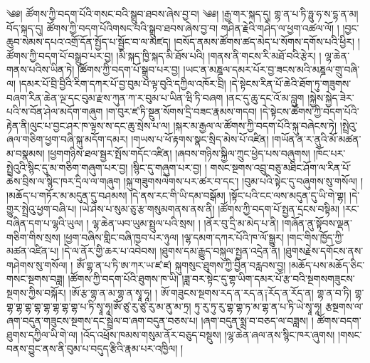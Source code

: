 ༄༅། ཚོགས་ཀྱི་བདག་པོའི་གསང་བའི་སྒྲུབ་ཐབས་ཞེས་བྱ་བ། ༄༅། །རྒྱ་གར་སྐད་དུ། གྷ་ན་པ་ཏི་ཧྥུ་ཧ་ས་དྷ་ན་མ། བོད་སྐད་དུ། ཚོགས་ཀྱི་བདག་པོའིགསང་བའི་སྒྲུབ་ཐབས་ཞེས་བྱ་བ། གཤིན་རྗེའི་གཤེད་ལ་ཕྱག་འཚལ་ལོ། ། །བྱང་ཆུབ་སེམས་དཔའ་འགྲོ་དོན་སྤྱོད་པ་སྦྱོང་བ་ལ་མཛད། །བསོད་ནམས་ཚོགས་ཚད་མེད་པ་སོགས་དགོས་པའི་ཕྱིར། ། ཚོགས་ཀྱི་བདག་པོ་བསྒྲུབ་པར་བྱ། །མི་སྐད་ཁྱི་སྐད་མི་ཐོས་པའི། །གནས་ནི་གངས་རི་མཐོ་བའི་རྩེར། ། ལྷ་ཆེན་གནས་པའིས་ཡིན་ཏེ། །ཚོགས་ཀྱི་བདག་པོ་སྒྲུབ་པར་བྱ། །ཡང་ན་མཎྜལ་དམར་པོར་བྱ་ཟངས་མའི་མཎྜལ་གྲུ་བཞི་ལ། །དམར་པོ་བྲི་བྱིའི་རིག་དཀར་པོ་བྱ་བུམ་པ་ལྟ་བུའི་དཀྱིལ་འཁོར་བྲི། །དེ་སྟེངས་རིན་པོ་ཆེའི་ཐོག་ཏུ་གཟུགས་བཞག་རིན་ཆེན་ལྔ་དང་བུམ་རྫས་ཀུན་ཀ་ར་བུམ་པ་ཡིན་ཝི་ཏི་བཞག །ནང་དུ་ཆུ་དང་འོ་མ་བླུག །སྐྱེས་སྐྱེད་ཟེར་པའི་ས་བོན་ཤེལ་མདོག་གཞུག །ག་བུར་ཛ་ཏི་སྔུན་སོགས་དྲི་བཟང་རྣམས་གདབ། །དེ་སྟེངས་ཚོགས་ཀྱི་བདག་པོའི་རྟེན་ནི།ལུང་པ་བྱང་ཤར་ཁ་ལྟས་ས་དང་ཆུ་སྲེས་པ་ལ། །སྐར་མ་རྒྱལ་ལ་ཚོགས་ཀྱི་བདག་པོའི་སྐུ་བཞེངས་ཏེ། །སྤྲེའུ་ཞལ་གཅིག་ཕྱག་བཞི་སྐུ་མདོག་དམར། །གཡས་པ་ཕོ་རྟགས་སྣང་སྲིད་མེས་པོ་འཛིན། །གཡོན་ན་ར་ནུའི་མོ་མཚན་མ་བསྣམས། །ཕྱགགཉིས་ཐལ་སྦྱར་སྤོས་གདོང་འཛིན། །ཞབས་གཉིས་སྐྱིལ་ཀྲུང་ཕྱེད་པས་བཞུགས། །ཁོང་པར་སྤྲེའུའི་སྙིང་དུ་མ་གཅིག་གཞུག་པར་བྱ། །སྙིང་དུ་གཞུག་པར་བྱ། ། གསང་སྔགས་འབྲུ་བཅུ་མཐིང་ཤོག་ལ་རིན་པོ་ཆེས་བྲིས་ལ་སྙིང་ཁར་དྲིལ་ལ་གཞུག །སྐུ་གཟུགསལེགས་པར་ཚར་བ་དང་། །བུམ་པའི་སྟེང་དུ་བཞུགས་སུ་གསོལ། ། །མཆོད་པ་གཏོར་མ་མདུན་དུ་བཤམས། །དེ་ནས་རང་གི་ཡི་དམ་བསྒོམ། །སྟོང་པའི་ངང་ལས་མདུན་དུ་ཡི་གེ་གྷ། །དེ་གྱུར་སྤྲེའུ་ཕྱག་བཞི་པ། །ཡེ་ཤེས་པ་སུམ་ཅུ་རྩ་གསུམགནས་ནས་ནི། །ཚོགས་ཀྱི་བདག་པོ་སྤྱན་དྲངས་བསྟིམ། །རང་བཞིན་དག་པ་ལྷའི་ཡུལ། ། ལྷ་ཆེན་ཡབ་ཡུམ་སྤྲུལ་པའི་སྲས། ། །ནོར་བུ་དྲི་མ་མེད་པ་ནི། །གཞོན་ནུ་སྟོབས་ལྡན་གཅིག་གིས་སྲས། །ཕྱག་བཞིས་གླིང་བཞི་ཁྱབ་པར་ཉུལ། །ལྷ་དམག་དཀར་པོའི་ཁ་ལོ་སྒྱུར། །གང་གིས་ཁྱོད་ཀྱི་མཚན་འཛིན་པ། །དེ་ལ་ནོར་གྱི་ཆར་པ་འབེབས། །ཐུགས་དམ་རྒྱུད་བསྐུལ་སྤྱན་འདྲེན་ན། །ཐུགསརྗེས་དགོངས་ནས་གཤེགས་སུ་གསོལ། ། ཨོཾ་གྷ་ན་པ་ཏི་ཨ་ཀར་ཡ་ཛ་ཛ། སྐུགསུང་ཐུགས་ཀྱི་བྱིན་བརླབས་བྱ། །མཆོད་པས་མཆོད་ཅིང་གསང་སྔགས་བཟླ། །ཚོགས་ཀྱི་བདག་པོའི་ཐུགས་ཁ་ཡི། །ཟླ་བར་སྟེང་དུ་གྷ་ཡིག་དམར་པོ་རྩ་བའི་སྔགསགཟུངས་སྔགས་ཀྱིས་བསྐོར། །ཨོ་རྩ་གྷ་ན་མ་གྷ་ན་སྭཱ་ཧཱ། ། ཨོ་གཟུངས་སྔགས་རད་ན་རད་ན༑རོད་ན་རོད་ན། གྷ་ན་བ་ཏི། གྷ་གྷ་གྷ་གྷ་གྷ་གྷ་གྷ་གྷ་གྷ་པ་ཏི་སྭཱ་ཧཱ།ཨོཾ་ཙུ་རུ་ཙུ་རུ་མ་ནུ་མ་ཏྲ། ཏུ་རུ་ཏུ་རུ་གྷ་གྷ་ཏ་མ་གྷ་ན་པ་ཏི་ཡེ་སྭཱ་ཧཱ། རྩསྔགས་ལ་ཞག་བདུན་གཟུངས་སྔགས་དང་སྦྲེལ་བ་ཞག་བདུན་བཅས་པ། །ཞག་བདུན་སྨྲ་བ་བཅད་ལ་བཟླས། ། ཚོགས་བདག་ཐུགས་དཀྱིལ་ཡི་གེ་ལ། །འོད་འཕྲོས་ཁམས་གསུམ་ནོར་བཅུད་བསྡུས། །ལྷ་ཆེན་ཞལ་ནས་སྙིང་ཁར་ཞུགས། །གསང་བནས་བྱུང་ནས་ནི་བུམ་པ་བདུད་རྩིའི་རྣམ་པར་འཁྱིལ། །
